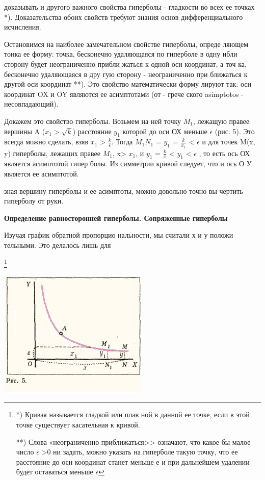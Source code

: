 \documentclass{article}
\newenvironment{Figure}
  {\par\medskip\noindent\minipage{\linewidth}}
  {\endminipage\par\medskip}
\begin{document}
\begin{multicols}{2}

доказывать и другого важного свойства гиперболы - гладкости во всех  ее точках *). Доказательства обоих  свойств требуют знания основ дифференциального исчисления. \par

\setlength{\parindent}{7ex}

Остановимся на наиболее замечательном свойстве гиперболы, опреде ляющем тонка ее форму: точка, бесконечно удаляющаяся по гиперболе в одну ибли сторону будет неограниченно прибли жаться к одной оси координат, а точ ка, бесконечно удаляющаяся в дру гую сторону - неограниченно при ближаться к другой оси координат **). Это свойство математически форму лируют так: оси координат OX и OY являются ее асимптотами (от - грече ского asimptotos - несовпадающий).\par
Докажем это свойство гиперболы. Возьмем на ней точку $ M_{1} $, лежащую правее вершины A (\(  x_{1}  > \sqrt{k}\)) расстояние $ y_{1} $ которой до оси ОХ меньше \(\epsilon \)   (рис. 5). Это всегда можно сделать, взяв $ x_{1} $ > \( \frac{k}{\epsilon} \). Тогда $ M_{1} $$ N_{1} $ = $ y_{1} $ = \( \frac{k}{ x_{1} } \) < \(\epsilon \)  и для точек M(x, y) гиперболы, лежащих правее $ M_{1} $, x> $ x_{1} $, и $ y_{1} $ = \( \frac{k}{ x } \) < $ y_{1} $ < \(\epsilon \) , то есть
ось ОХ является асимптотой гипер болы. Из симметрии кривой следует, что и ось О У является ее асимптотой. \par
зная вершину гиперболы и ее асимптоты, можно довольно точно вы чертить гиперболу от руки.\par
\textbf{Определение равносторонней гиперболы. Сопряженные гиперболы}

Изучая график обратной пропорцио нальности, мы считали х и у положи тельными. Это делалось лишь для

\lipsum\footnote{
*) Кривая называется гладкой или плав ной в данной ее точке, если в этой точке существует касательная к кривой.

**) Слова «неограниченно приближаться>> означают, что какое бы малое число \(\epsilon \) >0 ни задать, можно указать на гиперболе такую точку, что ее расстояние до осн координат станет меньше е и при дальнейшем удалении будет оставаться меньше \(\epsilon \)}\par




\lipsum

\lipsum
\begin{Figure}
 \centering
 \includegraphics[]{photo.png}


\end{Figure}
\end{multicols}
\end{document}
